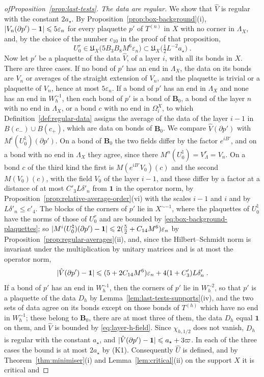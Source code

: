 \documentclass[11pt]{preprint}
\newcommand{\id}{\mathbf 1}
\DeclarePairedDelimiter{\abs}{\lvert}{\rvert}
\numberwithin{equation}{section}
\begin{document}
\begin{proof}[ofProposition~\ref{prop:last-tests}]
\emph{The data are regular.} We show that $\hat V$ is regular with the constant $2a_\star$. By Proposition~\ref{prop:box-background}(i), $\abs{V_n(\partial p') - \id} \leqslant 5\varepsilon_n$ for every plaquette $p'$ of $T^{(n)}$ in $X$ with no corner in $\Lambda_X$, and, by the choice of the number $c_{10}$ in the proof of that proposition,
\begin{equation}\label{eq:box-background-class}
    U^r_0 \in \mathfrak U_X\bigl(5B_3B_8M^6\varepsilon_n\bigr) \subset \mathfrak U_X\bigl(\tfrac{1}{2}L^{-2}a_\star\bigr)\;.
\end{equation}
Now let $p'$ be a plaquette of the data $\hat V$, of a layer $i$, with all its bonds in $X$. There are three cases. If no bond of $p'$ has an end in $\Lambda_X$, the data on its bonds are $V_n$ or averages of the straight extension of $V_n$, and the plaquette is trivial or a plaquette of $V_n$, hence at most $5\varepsilon_n$. If a bond of $p'$ has an end in $\Lambda_X$ and none has an end in $W_h^{\sim1}$, then each bond of $p'$ is a bond of $\mathbf B_0$, a bond of the layer $n$ with no end in $\Lambda_X$, or a bond $c$ with no end in $\Omega^X_i$, to which Definition~\ref{def:regular-data} assigns the average of the data of the layer $i - 1$ in $B(c_-) \cup B(c_+)$, which are data on bonds of $\mathbf B_0$. We compare $\hat V(\partial p')$ with $M^i(U^\natural_0)(\partial p')$. On a bond of $\mathbf B_0$ the two fields differ by the factor $e^{iB'}$, and on a bond with no end in $\Lambda_X$ they agree, since there $M^n(U^\natural_0) = V^r_\Lambda = V_n$. On a bond $c$ of the third kind the first is $M(e^{iB'}V_0)(c)$ and the second $M(V_0)(c)$, with the field $V_0$ of the layer $i - 1$, and these differ by a factor at a distance of at most $C'_3L\delta'_n$ from $\id$ in the operator norm, by Proposition~\ref{prop:relative-average-order}(vi) with the scales $i - 1$ and $i$ and by $L\delta'_n \leqslant c'_4$. The blocks of the corners of $p'$ lie in $X^{\sim-1}$, where the plaquettes of $U^\natural_0$ have the norms of those of $U^r_0$ and are bounded by \eqref{eq:box-background-plaquettes}; so $\abs{M^i(U^\natural_0)(\partial p') - \id} \leqslant 2(\frac{5}{2} + C_{14}M^6)\varepsilon_n$ by Proposition~\ref{prop:regular-averages}(ii), and, since the Hilbert--Schmidt norm is invariant under the multiplication by unitary matrices and is at most the operator norm,
\[
    \abs{\hat V(\partial p') - \id} \leqslant (5 + 2C_{14}M^6)\varepsilon_n + 4(1 + C'_3)L\delta'_n\;.
\]
If a bond of $p'$ has an end in $W_h^{\sim1}$, then the corners of $p'$ lie in $W_h^{\sim2}$, so that $p'$ is a plaquette of the data $D_h$ by Lemma~\ref{lem:last-tests-supports}(iv), and the two sets of data agree on its bonds except on those bonds of $T^{(h)}$ which have no end in $W_h^{\sim1}$; these belong to $\mathbf B_0$, there are at most three of them, the data $D_h$ equal $\id$ on them, and $\hat V$ is bounded by \eqref{eq:layer-h-field}. Since $\chi_{h,1/2}$ does not vanish, $D_h$ is regular with the constant $a_\star$, and $\abs{\hat V(\partial p') - \id} \leqslant a_\star + 3\varpi$. In each of the three cases the bound is at most $2a_\star$ by (K1). Consequently $\hat U$ is defined, and by Theorem~\ref{thm:minimiser}(i) and Lemma~\ref{lem:critical}(ii) on the support $X$ it is critical and

\end{proof}
\end{document}
